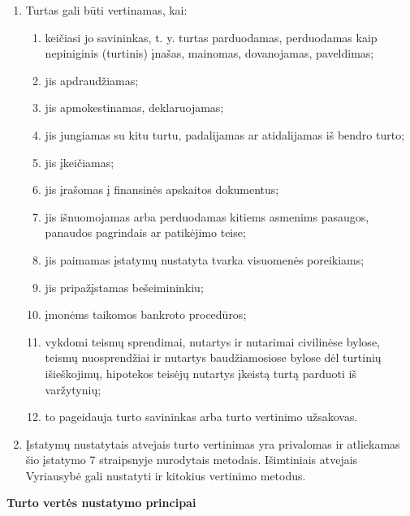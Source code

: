\begin{enumerate}
    \item Turtas gali būti vertinamas, kai:
    \begin{enumerate}
        \item keičiasi jo savininkas, t. y. turtas parduodamas, perduodamas kaip nepiniginis (turtinis) įnašas, mainomas, dovanojamas, paveldimas;
        \item jis apdraudžiamas;
        \item jis apmokestinamas, deklaruojamas;
        \item jis jungiamas su kitu turtu, padalijamas ar atidalijamas iš bendro turto;
        \item jis įkeičiamas;
        \item jis įrašomas į finansinės apskaitos dokumentus;
        \item jis išnuomojamas arba perduodamas kitiems asmenims pasaugos, panaudos pagrindais ar patikėjimo teise;
        \item jis paimamas įstatymų nustatyta tvarka visuomenės poreikiams;
        \item jis pripažįstamas bešeimininkiu;
        \item įmonėms taikomos bankroto procedūros;
        \item vykdomi teismų sprendimai, nutartys ir nutarimai civilinėse bylose, teismų nuosprendžiai ir nutartys baudžiamosiose bylose dėl turtinių išieškojimų, hipotekos teisėjų nutartys įkeistą turtą parduoti iš varžytynių;
        \item to pageidauja turto savininkas arba turto vertinimo užsakovas.
    \end{enumerate}
    \item Įstatymų nustatytais atvejais turto vertinimas yra privalomas ir atliekamas šio įstatymo 7 straipsnyje nurodytais metodais. Išimtiniais atvejais Vyriausybė gali nustatyti ir kitokius vertinimo metodus.
\end{enumerate}



\textbf{Turto vertės nustatymo principai}

